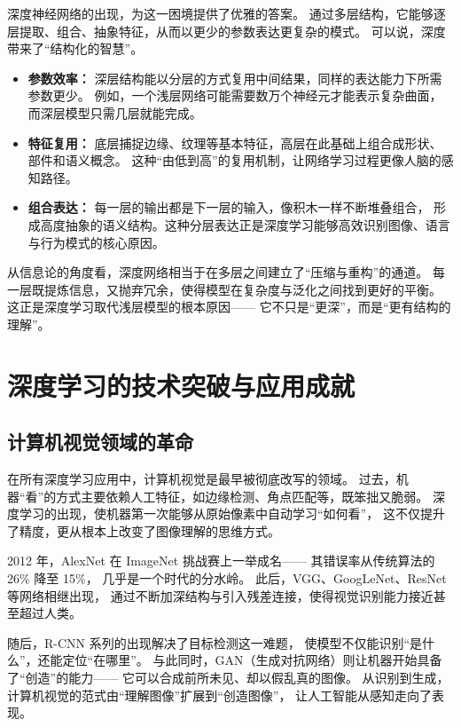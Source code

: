 深度神经网络的出现，为这一困境提供了优雅的答案。  
通过多层结构，它能够逐层提取、组合、抽象特征，从而以更少的参数表达更复杂的模式。  
可以说，深度带来了“结构化的智慧”。

\begin{itemize}
\item {\bf 参数效率：} 深层结构能以分层的方式复用中间结果，同样的表达能力下所需参数更少。  
例如，一个浅层网络可能需要数万个神经元才能表示复杂曲面，而深层模型只需几层就能完成。
\item {\bf 特征复用：} 底层捕捉边缘、纹理等基本特征，高层在此基础上组合成形状、部件和语义概念。  
这种“由低到高”的复用机制，让网络学习过程更像人脑的感知路径。
\item {\bf 组合表达：} 每一层的输出都是下一层的输入，像积木一样不断堆叠组合，  
形成高度抽象的语义结构。这种分层表达正是深度学习能够高效识别图像、语言与行为模式的核心原因。
\end{itemize}

从信息论的角度看，深度网络相当于在多层之间建立了“压缩与重构”的通道。  
每一层既提炼信息，又抛弃冗余，使得模型在复杂度与泛化之间找到更好的平衡。  
这正是深度学习取代浅层模型的根本原因——  
它不只是“更深”，而是“更有结构的理解”。

\section{深度学习的技术突破与应用成就}

\subsection{计算机视觉领域的革命}

在所有深度学习应用中，计算机视觉是最早被彻底改写的领域。  
过去，机器“看”的方式主要依赖人工特征，如边缘检测、角点匹配等，既笨拙又脆弱。  
深度学习的出现，使机器第一次能够从原始像素中自动学习“如何看”，  
这不仅提升了精度，更从根本上改变了图像理解的思维方式。  

2012 年，AlexNet 在 ImageNet 挑战赛上一举成名——  
其错误率从传统算法的 26\% 降至 15\%，  
几乎是一个时代的分水岭。  
此后，VGG、GoogLeNet、ResNet 等网络相继出现，  
通过不断加深结构与引入残差连接，使得视觉识别能力接近甚至超过人类。  

随后，R-CNN 系列的出现解决了目标检测这一难题，  
使模型不仅能识别“是什么”，还能定位“在哪里”。  
与此同时，GAN（生成对抗网络）则让机器开始具备了“创造”的能力——  
它可以合成前所未见、却以假乱真的图像。  
从识别到生成，计算机视觉的范式由“理解图像”扩展到“创造图像”，  
让人工智能从感知走向了表现。


